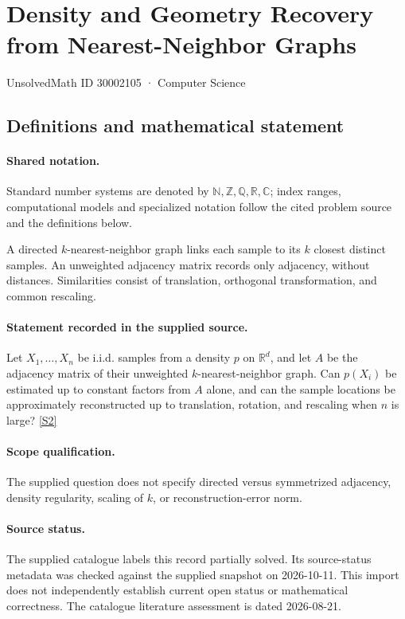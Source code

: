 \documentclass[11pt]{article}
\newcommand{\sref}[2]{\hyperlink{source:#1:#2}{[S#2]}}
\begin{document}
\setcounter{section}{30002104}
\section{Density and Geometry Recovery from Nearest-Neighbor Graphs}\label{30002105}
{\small\sffamily UnsolvedMath ID 30002105 · Computer Science}
\subsection{Definitions and mathematical statement}

\paragraph{Shared notation.}Standard number systems are denoted by $\mathbb N,\mathbb Z,\mathbb Q,\mathbb R,\mathbb C$; index ranges, computational models and specialized notation follow the cited problem source and the definitions below.


A directed $k$-nearest-neighbor graph links each sample to its $k$ closest distinct samples. An unweighted adjacency matrix records only adjacency, without distances. Similarities consist of translation, orthogonal transformation, and common rescaling.
\paragraph{Statement recorded in the supplied source.}
Let $X_1,\ldots,X_n$ be i.i.d. samples from a density $p$ on $\mathbb R^d$, and let $A$ be the adjacency matrix of their unweighted $k$-nearest-neighbor graph. Can $p(X_i)$ be estimated up to constant factors from $A$ alone, and can the sample locations be approximately reconstructed up to translation, rotation, and rescaling when $n$ is large? \sref{30002105}{2}
\paragraph{Scope qualification.}
The supplied question does not specify directed versus symmetrized adjacency, density regularity, scaling of $k$, or reconstruction-error norm.
\paragraph{Source status.}
The supplied catalogue labels this record partially solved. Its source-status metadata was checked against the supplied snapshot on 2026-10-11. This import does not independently establish current open status or mathematical correctness. The catalogue literature assessment is dated 2026-08-21.
\end{document}
